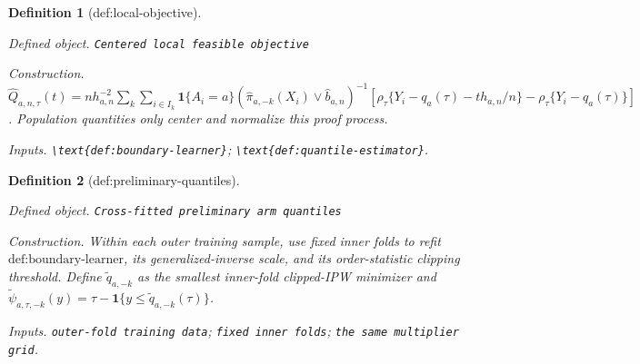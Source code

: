 \documentclass{article}
\newtheorem{definition}{Definition}
\begin{document}
\begin{definition}[def:local-objective]\label{def:local-objective}
\par\smallskip\noindent\emph{Defined object.} \texttt{Centered local feasible objective}
\par\smallskip\noindent\emph{Construction.} \(\widehat Q_{a,n,\tau}(t)=nh_{a,n}^{-2}\sum_k\sum_{i\in I_k}\mathbf1\{A_i=a\}(\widehat\pi_{a,-k}(X_i)\vee\widehat b_{a,n})^{-1}[\rho_\tau\{Y_i-q_a(\tau)-th_{a,n}/n\}-\rho_\tau\{Y_i-q_a(\tau)\}]\). Population quantities only center and normalize this proof process.
\par\smallskip\noindent\emph{Inputs.} \texttt{\textbackslash{}\allowbreak{}text\{def:\allowbreak{}boundary-\allowbreak{}learner\}\allowbreak{}}; \texttt{\textbackslash{}\allowbreak{}text\{def:\allowbreak{}quantile-\allowbreak{}estimator\}\allowbreak{}}.
\end{definition}

\begin{definition}[def:preliminary-quantiles]\label{def:preliminary-quantiles}
\par\smallskip\noindent\emph{Defined object.} \texttt{Cross-\allowbreak{}fitted preliminary arm quantiles}
\par\smallskip\noindent\emph{Construction.} Within each outer training sample, use fixed inner folds to refit \(\text{def:boundary-learner}\), its generalized-inverse scale, and its order-statistic clipping threshold. Define \(\widetilde q_{a,-k}\) as the smallest inner-fold clipped-IPW minimizer and \(\widetilde\psi_{a,\tau,-k}(y)=\tau-\mathbf1\{y\le\widetilde q_{a,-k}(\tau)\}\).
\par\smallskip\noindent\emph{Inputs.} \texttt{outer-\allowbreak{}fold training data}; \texttt{fixed inner folds}; \texttt{the same multiplier grid}.
\end{definition}
\end{document}
